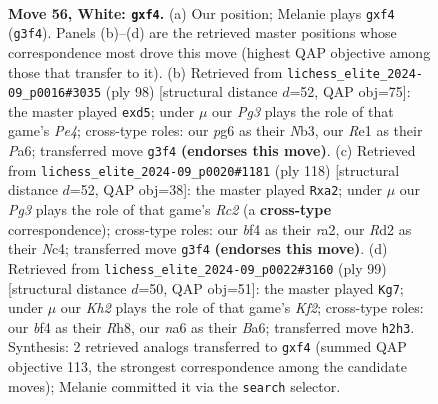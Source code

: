 \documentclass[11pt]{article}
\begin{document}
\clearpage

\begin{figure}[p]\centering
\begin{subfigure}{0.46\textwidth}\centering
\resizebox{\linewidth}{!}{%
\newchessgame
\chessboard[
  setfen={2k5/1p5p/n5pP/p4p2/5b2/r5P1/3R3K/4R3 w - - 0 56},
  showmover=false,
  pgfstyle=straightmove, color=movearrow, markmove={g3-f4}
]}
\caption{}
\end{subfigure}\hfill
\begin{subfigure}{0.46\textwidth}\centering
\resizebox{\linewidth}{!}{%
\newchessgame
\chessboard[
  setfen={7r/3k2p1/P2p4/3bp3/2P1P3/1N1K4/8/8 w - - 0 50},
  showmover=false,
  pgfstyle=straightmove, color=movearrow, markmove={e4-d5}
]}
\caption{}
\end{subfigure}
\\[4pt]
\begin{subfigure}{0.46\textwidth}\centering
\resizebox{\linewidth}{!}{%
\newchessgame
\chessboard[
  setfen={5k2/5p2/4b1p1/8/2N2b1p/7P/r1R1K1P1/8 w - - 2 60},
  showmover=false,
  pgfstyle=straightmove, color=movearrow, markmove={c2-a2}
]}
\caption{}
\end{subfigure}\hfill
\begin{subfigure}{0.46\textwidth}\centering
\resizebox{\linewidth}{!}{%
\newchessgame
\chessboard[
  setfen={7r/5k1P/b4p1R/3pp1B1/P7/2P2P2/5K2/8 b - - 1 50},
  showmover=false,
  pgfstyle=straightmove, color=movearrow, markmove={f7-g7}
]}
\caption{}
\end{subfigure}
\caption{\textbf{Move 56, White: \texttt{gxf4}.} (a) Our position; Melanie plays \texttt{gxf4} (\texttt{g3f4}). Panels (b)--(d) are the retrieved master positions whose correspondence most drove this move (highest QAP objective among those that transfer to it). (b) Retrieved from \texttt{lichess\_elite\_2024-09\_p0016\#3035} (ply 98) [structural distance $d$=52, QAP obj=75]: the master played \texttt{exd5}; under $\mu$ our \emph{Pg3} plays the role of that game's \emph{Pe4}; cross-type roles: our \emph{p}g6 as their \emph{N}b3, our \emph{R}e1 as their \emph{P}a6; transferred move \texttt{g3f4} \textbf{(endorses this move)}. (c) Retrieved from \texttt{lichess\_elite\_2024-09\_p0020\#1181} (ply 118) [structural distance $d$=52, QAP obj=38]: the master played \texttt{Rxa2}; under $\mu$ our \emph{Pg3} plays the role of that game's \emph{Rc2} (a \textbf{cross-type} correspondence); cross-type roles: our \emph{b}f4 as their \emph{r}a2, our \emph{R}d2 as their \emph{N}c4; transferred move \texttt{g3f4} \textbf{(endorses this move)}. (d) Retrieved from \texttt{lichess\_elite\_2024-09\_p0022\#3160} (ply 99) [structural distance $d$=50, QAP obj=51]: the master played \texttt{Kg7}; under $\mu$ our \emph{Kh2} plays the role of that game's \emph{Kf2}; cross-type roles: our \emph{b}f4 as their \emph{R}h8, our \emph{n}a6 as their \emph{B}a6; transferred move \texttt{h2h3}. Synthesis: 2 retrieved analogs transferred to \texttt{gxf4} (summed QAP objective 113, the strongest correspondence among the candidate moves); Melanie committed it via the \texttt{search} selector.}
\label{fig:thought-m110}
\end{figure}
\end{document}
